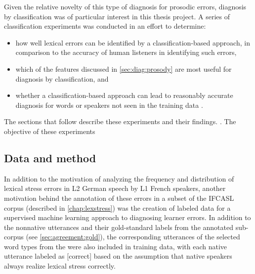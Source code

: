 	 
	 Given the relative novelty of this type of diagnosis for prosodic errors, diagnosis by classification was of particular interest in this thesis project. A series of classification experiments was conducted in an effort to determine:
	 \begin{itemize}
	 \item how well lexical errors can be identified by a classification-based approach, in comparison to the accuracy of human listeners in identifying such errors, 
	 \item which of the features discussed in \cref{sec:diag:prosody} are most useful for diagnosis by classification, and
	 \item whether a classification-based approach can lead to reasonably accurate diagnosis for words or speakers not seen in the training data .
	 \end{itemize}
	 The sections that follow describe these experiments and their findings. . 
	 The objective of these experiments 
	 
	\subsection{Data and method}
	\label{sec:classification:datamethod}
	
		
		In addition to the motivation of analyzing the frequency and distribution of lexical stress errors in L2 German speech by L1 French speakers, another motivation behind the annotation of these errors in a subset of the IFCASL corpus (described in \cref{chap:lexstress}) was the creation of labeled data for a supervised machine learning approach to diagnosing learner errors. In addition to the nonnative utterances and their gold-standard labels from the annotated sub-corpus (see \cref{sec:agreement:gold}), the corresponding utterances of the selected word types from the  were also included in training data, with each native utterance labeled as [correct] based on the assumption that native speakers always realize lexical stress correctly.
		
